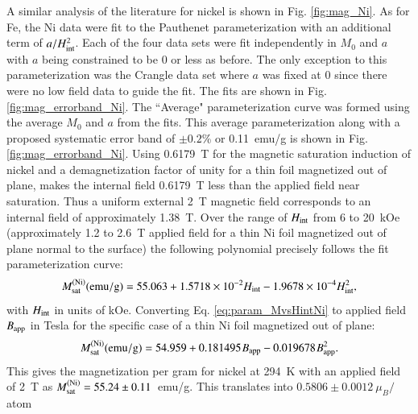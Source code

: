 \documentclass[preprint,12pt]{elsarticle}
\begin{document}
A similar analysis of the literature for nickel is shown in Fig. \ref{fig:mag_Ni}. As for Fe, the Ni data were fit to the Pauthenet parameterization with an additional term of $a/H_{\rm int}^2$. Each of the four data sets were fit independently in $M_0$ and $a$ with $a$ being constrained to be 0 or less as before. The only exception to this parameterization was the Crangle data set where $a$ was fixed at 0 since there were no low field data to guide the fit. The fits are shown in Fig. \ref{fig:mag_errorband_Ni}. The ``Average" parameterization curve was formed using the average $M_0$ and $a$ from the fits. This average parameterization along with a proposed systematic error band of $\pm0.2$\% or 0.11~emu/g is shown in Fig.\ref{fig:mag_errorband_Ni}.  Using 0.6179~T for the magnetic saturation induction of nickel and a demagnetization factor of unity for a thin foil magnetized out of plane, makes the internal field 0.6179~T less than the applied field near saturation. Thus a uniform external 2~T magnetic field corresponds to an internal field of approximately 1.38~T. Over the range of $H_{\rm int}$ from 6 to 20~kOe (approximately 1.2 to 2.6~T applied field for a thin Ni foil magnetized out of plane normal to the surface) the following polynomial precisely follows the fit parameterization curve: 
\begin{equation}
M_{\rm sat}^{\rm (Ni)}({\rm emu/g})=55.063+1.5718\times 10^{-2}H_{\rm int}-1.9678\times 10^{-4}H_{\rm int}^2,
\label{eq:param_MvsHintNi}
\end{equation}
with $H_{\rm int}$ in units of kOe. Converting Eq. \ref{eq:param_MvsHintNi} to applied field $B_{\rm app}$ in Tesla for the specific case of a thin Ni foil magnetized out of plane:
\begin{equation}
M_{\rm sat}^{\rm (Ni)}({\rm emu/g})=54.959+0.181495\hspace{.06667em}B_{\rm app}-0.019678\hspace{.06667em}B_{\rm app}^2.
\end{equation}
This gives the magnetization per gram for nickel at 294~K with an applied field of 2~T as $M_{\rm sat}^{\rm (Ni)}=55.24\pm0.11$~emu/g. This translates into $0.5806\pm0.0012~\mu_B/$atom 
\end{document}
